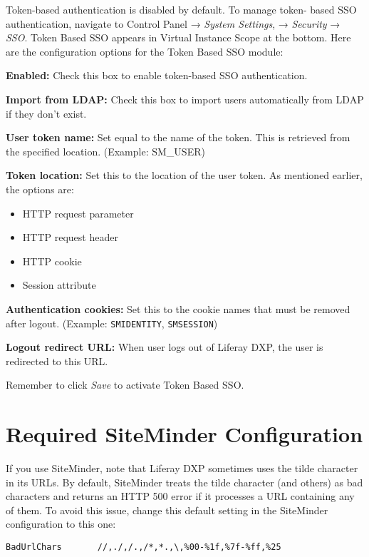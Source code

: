 Token-based authentication is disabled by default. To manage token-
based SSO authentication, navigate to Control Panel → \emph{System
Settings}, → \emph{Security} → \emph{SSO}. Token Based SSO appears in
Virtual Instance Scope at the bottom. Here are the configuration options
for the Token Based SSO module:

\textbf{Enabled:} Check this box to enable token-based SSO
authentication.

\textbf{Import from LDAP:} Check this box to import users automatically
from LDAP if they don't exist.

\textbf{User token name:} Set equal to the name of the token. This is
retrieved from the specified location. (Example: SM\_USER)

\textbf{Token location:} Set this to the location of the user token. As
mentioned earlier, the options are:

\begin{itemize}
\tightlist
\item
  HTTP request parameter
\item
  HTTP request header
\item
  HTTP cookie
\item
  Session attribute
\end{itemize}

\textbf{Authentication cookies:} Set this to the cookie names that must
be removed after logout. (Example: \texttt{SMIDENTITY},
\texttt{SMSESSION})

\textbf{Logout redirect URL:} When user logs out of Liferay DXP, the
user is redirected to this URL.

Remember to click \emph{Save} to activate Token Based SSO.

\section{Required SiteMinder
Configuration}\label{required-siteminder-configuration}

If you use SiteMinder, note that Liferay DXP sometimes uses the tilde
character in its URLs. By default, SiteMinder treats the tilde character
(and others) as bad characters and returns an HTTP 500 error if it
processes a URL containing any of them. To avoid this issue, change this
default setting in the SiteMinder configuration to this one:

\begin{verbatim}
BadUrlChars       //,./,/.,/*,*.,\,%00-%1f,%7f-%ff,%25
\end{verbatim}

